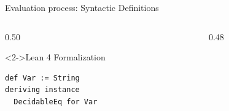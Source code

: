 \documentclass[xcolor={dvipsnames,table}]{beamer}
\begin{document}
\begin{frame}[fragile]{Evaluation process: \alert{Syntactic Definitions}}

    
    \begin{columns}[T]
        
        \begin{column}{0.50\textwidth}
            \begin{block}<2->{Lean 4 Formalization}
                \begin{lstlisting}[style=lean4]
def Var := String
deriving instance
  DecidableEq for Var
                \end{lstlisting}
            \end{block}
        \end{column}

        \begin{column}{0.48\textwidth}
        \end{column}
        
    \end{columns}
\end{frame}
\end{document}
